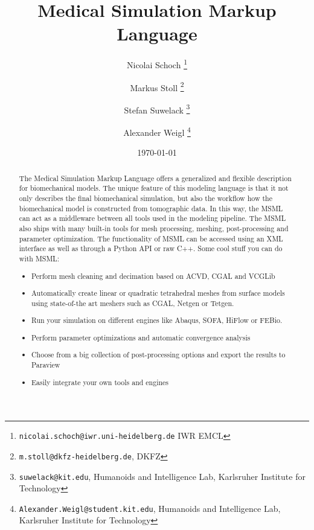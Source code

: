 \documentclass[a4paper]{article}
\begin{document}

\title{Medical Simulation Markup Language}

\author{%
  Nicolai Schoch
  \thanks{\texttt{nicolai.schoch@iwr.uni-heidelberg.de}
    IWR EMCL}
  \and
  Markus Stoll
  \thanks{\texttt{m.stoll@dkfz-heidelberg.de}, DKFZ}
  \and
  Stefan Suwelack
  \thanks{\texttt{suwelack@kit.edu},
    Humanoids and Intelligence Lab, Karlsruher Institute for Technology}
  \and
  Alexander Weigl
  \thanks{\texttt{Alexander.Weigl@student.kit.edu},
    Humanoids and Intelligence Lab, Karlsruher Institute for Technology}
}

\date{\today}
%
     \maketitle
     \begin{abstract}
		
		The Medical Simulation Markup Language offers a generalized and flexible description for biomechanical models. The unique feature of this modeling language is that it not only describes the final biomechanical simulation, but also the workflow how the biomechanical model is constructed from tomographic data. In this way, the MSML can act as a middleware between all tools used in the modeling pipeline. The MSML also ships with many built-in tools for mesh processing, meshing, post-processing and parameter optimization. The functionality of MSML can be accessed using an XML interface as well as through a Python API or raw C++. Some cool stuff you can do with MSML:
		
		\begin{itemize}
		\item Perform mesh cleaning and decimation based on ACVD, CGAL and VCGLib
			\item Automatically create linear or quadratic tetrahedral meshes from surface models using state-of-the art meshers such as CGAL, Netgen or Tetgen.
			\item Run your simulation on different engines like Abaqus, SOFA, HiFlow or FEBio.
			\item Perform parameter optimizations and automatic convergence analysis
			\item Choose from a big collection of post-processing options and export the results to Paraview
			\item Easily integrate your own tools and engines
		\end{itemize}



			
     \end{abstract}

\clearpage















\end{document}
